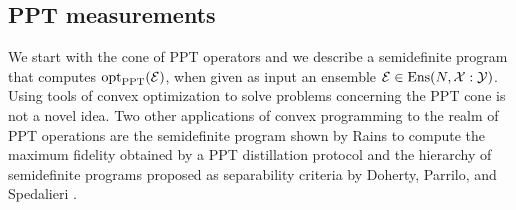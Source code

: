 \subsection{PPT measurements}
\label{sec:ppt-measurements-program}
We start with the cone of PPT operators and we describe a semidefinite program 
that computes $\operatorname{opt}_{\mathrm{PPT}}(\mathcal{E})$, when given as input an ensemble $\mathcal{E}\in\mathrm{Ens}(N,\mathcal{X}:\mathcal{Y})$. 
Using tools of convex optimization to solve problems concerning the PPT cone 
is not a novel idea. 
Two other applications of convex programming to the realm of PPT operations 
are the semidefinite program shown by Rains to compute the maximum fidelity 
obtained by a PPT distillation protocol \cite{Rains01} and the hierarchy of 
semidefinite programs proposed as separability criteria by Doherty, Parrilo, and
Spedalieri \cite{Doherty02,Doherty04}.

